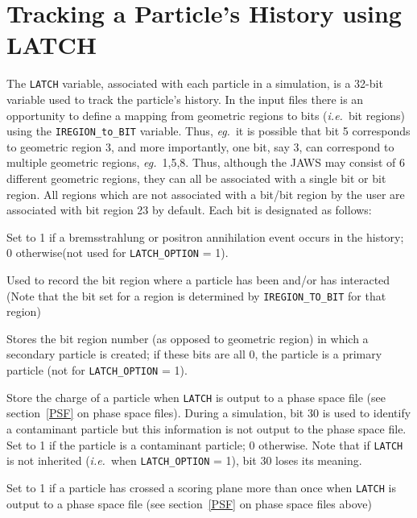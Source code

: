 \documentclass[12pt,twoside]{article}
\newcommand{\ie}{{\em i.e.}}
\newcommand{\eg}{{\em eg.}}
\begin{document}
\section{Tracking a Particle's History using LATCH}
\label{LATCH}

The \verb+LATCH+ variable, associated with each particle in a simulation, is a
32-bit variable used to track the particle's history. In the input files
there is an opportunity to define a mapping from geometric regions to
bits (\ie\ bit regions)
using the \verb+IREGION_to_BIT+ variable.  Thus, \eg\ it is
possible that bit 5 corresponds to geometric region 3, and more
importantly, one bit, say 3, can correspond to multiple geometric
regions, \eg\ 1,5,8.  Thus, although the JAWS may consist of 6 different
geometric regions, they can all be associated with a single bit or bit
region.  All regions which are not associated with a bit/bit region by the
user are associated with bit region 23 by default.
Each bit is designated as follows:
\begin{description}

 
 
\item [bit 0] Set to 1 if a bremsstrahlung or positron annihilation
event occurs in the history; 0 otherwise(not used for \verb+LATCH_OPTION+ = 1).
\item [bit 1-23] Used to record the bit region where a particle has been and/or
has interacted (Note that the bit set for a region is determined by
\verb+IREGION_TO_BIT+ for that region)
\item [bit 24-28] Stores the bit region number (as opposed to geometric
region) in which a secondary particle
is created; if these bits are all 0, the particle is a primary
particle (not for \verb+LATCH_OPTION+ = 1).
\item [bit 29-30] Store the charge of a particle when \verb+LATCH+ is output
to a phase space file (see section~\ref{PSF} on phase space files).
During a simulation, bit 30 is used to identify  a contaminant particle
but this information is not output to the phase space file. Set to 1 if
the particle is a contaminant particle; 0 otherwise. Note that if
\verb+LATCH+ is not inherited (\ie\ when \verb+LATCH_OPTION+ = 1), bit 30
loses its meaning.


\item [bit 31] Set to 1 if a particle has crossed a scoring plane
more than once when \verb+LATCH+ is output to a phase space file
(see section~\ref{PSF} on phase space files above)
\end{description}
\end{document}
